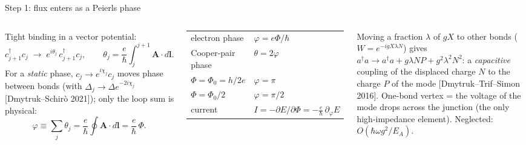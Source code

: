 \documentclass[aspectratio=169,9pt]{beamer}
\newcommand{\hw}{\hbar\omega}
\renewcommand{\cite}[1]{{\scriptsize\textcolor{ink!60}{[#1]}}}
\begin{document}
\begin{frame}{Step 1: flux enters as a Peierls phase}
  \begin{columns}[T]
    Tight binding in a vector potential:
    \[
      c^\dagger_{j+1}c_j\;\longrightarrow\;e^{i\theta_j}\,c^\dagger_{j+1}c_j,\qquad
      \theta_j=\frac{e}{\hbar}\int_j^{j+1}\!\mathbf A\cdot d\mathbf l .
    \]
    For a \emph{static} phase, $c_j\to e^{i\chi_j}c_j$ moves phase between bonds (with $\Delta_j\to\Delta e^{-2i\chi_j}$
    \cite{Dmytruk--Schir\`o 2021}); only the loop sum is physical:
    \[
      \varphi\equiv\sum_j\theta_j=\frac{e}{\hbar}\oint\mathbf A\cdot d\mathbf l=\frac{e}{\hbar}\,\Phi .
    \]
    \begin{calcbox}[title={Dictionary (keep this in mind!)}]
      \small
      \begin{tabular}{@{}ll@{}}
        electron phase & $\varphi=e\Phi/\hbar$\\
        Cooper-pair phase & $\theta=2\varphi$\\
        $\Phi=\Phi_0=h/2e$ & $\varphi=\pi$\\
        $\Phi=\Phi_0/2$ & $\varphi=\pi/2$\\
        current & $I=-\partial E/\partial\Phi=-\tfrac{e}{\hbar}\,\partial_\varphi E$
      \end{tabular}
    \end{calcbox}
    \begin{warnbox}[title={For the quantized flux the placement is physics, not gauge}]
      \footnotesize Moving a fraction $\lambda$ of $gX$ to other bonds ($W=e^{-igX\lambda N}$) gives
      $a^\dagger a\to a^\dagger a+g\lambda NP+g^2\lambda^2N^2$: a \emph{capacitive} coupling of the displaced charge $N$
      to the charge $P$ of the mode \cite{Dmytruk--Trif--Simon 2016}. One-bond vertex = the voltage of the mode drops
      across the junction (the only high-impedance element). Neglected: $O(\hw g^2/E_A)$.
    \end{warnbox}
  \end{columns}
\end{frame}
\end{document}
